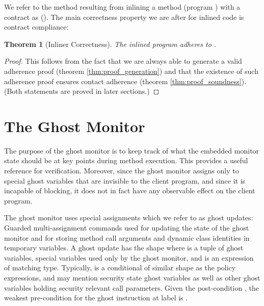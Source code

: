 \documentclass[10pt,twocolumn]{article}
\newtheorem{theorem}{Theorem}
\begin{document}
We refer to the method resulting from inlining a method  (program ) with a contract  as  (). The main correctness property we are after for inlined code is contract compliance:
\begin{theorem}[Inliner Correctness]
The inlined program   adheres to .
\end{theorem}
\begin{proof}
This follows from the fact that we are always able to generate a valid adherence proof (theorem \ref{thm:proof_generation}) and that the existence of such adherence proof ensures contact adherence (theorem \ref{thm:proof_soundness}). (Both statements are proved in later sections.)
\end{proof}


\section{The Ghost Monitor}
The purpose of the ghost monitor is to keep track of what the embedded
monitor state should be at key points during method execution. This provides
a useful reference for verification. Moreover, since the ghost monitor assigns only to 
special ghost variables that are invisible to the client program, and
since it is incapable of blocking, it does not in fact
have any observable effect on the client program.

The ghost monitor uses
special assignments which we refer to as ghost updates: Guarded multi-assignment 
commands used for updating the state of the ghost monitor and for 
storing method call 
arguments and dynamic class identities in temporary variables.
A ghost update has the 
shape  where  is a tuple of 
ghost variables, special variables used only by the ghost monitor, and 
 is an expression of matching type. Typically, 
 is a conditional of similar shape as the policy expressions, and 
 may mention security state ghost variables as well as other ghost 
variables holding security relevant call parameters. Given the 
post-condition , the weakest pre-condition for the ghost 
instruction  at label  is 
.
\end{document}
